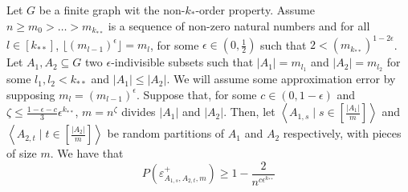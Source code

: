     \lemma[Claim 4.13]\label{bound_on_the_probability_of_a_subpair_having_no_exceptions}
        Let $G$ be a finite graph wit the non-$k_{*}$-order property.
        Assume $n \geq m_0 > \dots > m_{k_{**}}$ is a sequence of non-zero natural numbers and for all $l \in [k_{**}]$,
            $\lfloor (m_{l-1})^\epsilon \rfloor = m_l$, for some $\epsilon \in (0, \frac{1}{2})$ such that $2 < (m_{k_{**}})^{1-2\epsilon}$.
        Let $A_1, A_2 \subseteq G$ two $\epsilon$-indivisible subsets such that $|A_1| = m_{l_1}$ and $|A_2| = m_{l_2}$
            for some $l_1, l_2 < k_{**}$ and $|A_1| \leq |A_2|$.
        We will assume some approximation error by supposing $m_l = (m_{l-1})^\epsilon$.
        Suppose that, for some $c \in (0, 1-\epsilon)$ and $\zeta \leq \frac{1 - \epsilon - c}{3}\epsilon^{k_{**}}$,
            $m = n^\zeta$ divides $|A_1|$ and $|A_2|$.
        Then, let $\left< A_{1,s} \mid s \in \left[ \frac{|A_1|}{m} \right] \right>$ and
            $\left< A_{2,t} \mid t \in \left[ \frac{|A_2|}{m} \right] \right>$ be random partitions of $A_1$ and $A_2$
            respectively, with pieces of size $m$.
        We have that
        \[
            P(\varepsilon^+_{A_{1,s},A_{2,t},m}) \geq 1 - \frac{2}{n^{c\epsilon^{k_{**}}}}
        \]
